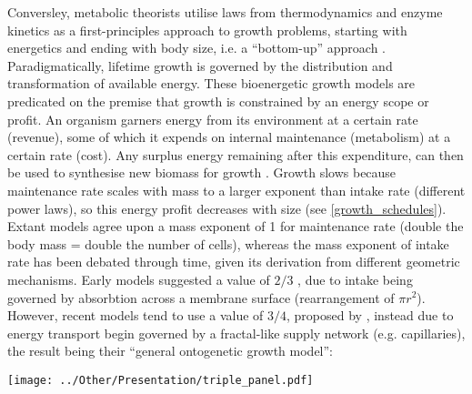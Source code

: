 \documentclass[a4paper]{article} %
\begin{document}
    Conversley, metabolic theorists utilise laws from thermodynamics and enzyme kinetics as a first-principles approach to growth problems, starting with energetics and ending with body size, i.e. a ``bottom-up'' approach \autocite{Brown2004}. Paradigmatically, lifetime growth is governed by the distribution and transformation of available energy. These bioenergetic growth models are predicated on the premise that growth is constrained by an energy scope or profit. An organism garners energy from its environment at a certain rate (revenue), some of which it expends on internal maintenance (metabolism) at a certain rate (cost). Any surplus energy remaining after this expenditure, can then be used to synthesise new biomass for growth \autocite{Holdway1984, Rochet2001, Enberg2012, VanGemert2019}. Growth slows because maintenance rate scales with mass to a larger exponent than intake rate (different power laws), so this energy profit decreases with size (see \cref{growth_schedules}). Extant models agree upon a mass exponent of 1 for maintenance rate (double the body mass = double the number of cells), whereas the mass exponent of intake rate has been debated through time, given its derivation from different geometric mechanisms. Early models suggested a value of $2/3$ \autocite{Putter1920,vonBert1938, VonBertalanffy1957}, due to intake being governed by absorbtion across a membrane surface (rearrangement of $\pi r^2$). However, recent models tend to use a value of $3/4$, proposed by \textcite{West1997}, instead due to energy transport begin governed by a fractal-like supply network (e.g. capillaries), the result being their ``general ontogenetic growth model'':

    \begin{center}
        \begin{minipage}{\linewidth}
        \texttt{[image: ../Other/Presentation/triple\_panel.pdf]}
        \label{growth_schedules}
        \end{minipage}%
    \end{center}
\end{document}
